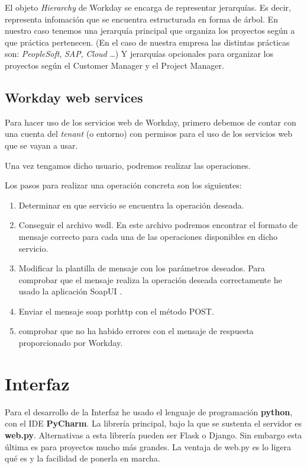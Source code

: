 El objeto \textit{Hierarchy} de Workday se encarga de representar jerarquías.
Es decir, representa infomación que se encuentra estructurada en forma de árbol.
En nuestro caso tenemos una jerarquía principal que organiza los proyectos según a que práctica pertenecen. 
(En el caso de nuestra empresa las distintas prácticas son: \textit{PeopleSoft}, \textit{SAP}, \textit{Cloud} \ldots)
Y jerarquías opcionales para organizar los proyectos según el Customer Manager y el Project Manager.

\subsection{Workday web services}

Para hacer uso de los servicios web de Workday, primero debemos de contar con una cuenta del \textit{tenant} (o entorno) con permisos para el uso de los servicios web que se vayan a usar.

Una vez tengamos dicho usuario, podremos realizar las operaciones.

Los pasos para realizar una operación concreta son los siguientes:

\begin{enumerate}
	\item Determinar en que servicio se encuentra la operación deseada.
	\item Conseguir el archivo \acrshort{wsdl}. En este archivo podremos encontrar el formato de mensaje correcto para cada una de las operaciones disponibles en dicho servicio.
	\item Modificar la plantilla de mensaje con los parámetros deseados. 
	Para comprobar que el mensaje realiza la operación deseada correctamente he usado la aplicación SoapUI \cite{soapui}.
	\item Enviar el mensaje \acrshort{soap} por\acrshort{http} con el método POST.
	\item comprobar que no ha habido errores con el mensaje de respuesta proporcionado por Workday.
\end{enumerate}



\section{Interfaz}


Para el desarrollo de la Interfaz he usado el lenguaje de programación \textbf{python}, con el IDE \textbf{PyCharm}. La librería principal, bajo la que se sustenta el servidor es \textbf{web.py}.
Alternativas a esta librería pueden ser Flask o Django. Sin embargo esta última es para proyectos mucho más grandes. La ventaja de web.py es lo ligera qué es y la facilidad de ponerla en marcha.

